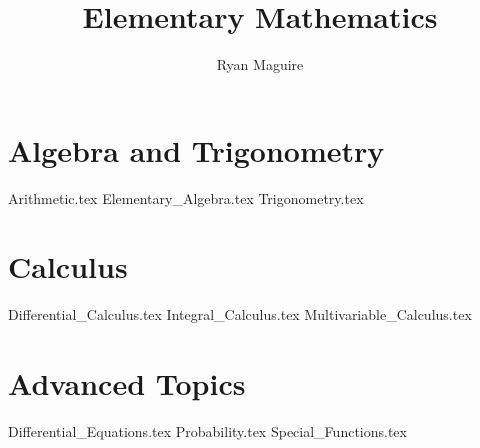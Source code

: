 \documentclass[crop=false,class=book,oneside]{standalone}
\begin{document}
    \newif\ifmathcourses
    \ifx\ifmain\undefined
        \title{Elementary Mathematics}
        \author{Ryan Maguire}
        \date{\vspace{-5ex}}
        \maketitle
        \tableofcontents
        \listoffigures
        \listoftables
        \clearpage
    \fi
    \part{Algebra and Trigonometry}
        {Arithmetic.tex}
        {Elementary_Algebra.tex}
        {Trigonometry.tex}
    \part{Calculus}
        {Differential_Calculus.tex}
        {Integral_Calculus.tex}
        {Multivariable_Calculus.tex}
    \part{Advanced Topics}
        {Differential_Equations.tex}
        {Probability.tex}
        {Special_Functions.tex}
\end{document}
